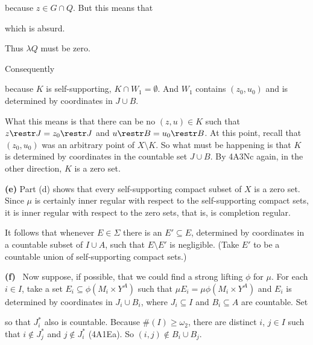 {\noindent because $z\in G\cap Q$.   But this means that 
      
      
\noindent which is absurd.\ \Bang 
      
Thus $\lambda Q$ must be zero. 
      
\medskip 
      
 Consequently 
      
      
\noindent because $K$ is self-supporting, $K\cap W_1=\emptyset$.   And 
$W_1$ contains $(z_0,u_0)$ and is determined by coordinates in $J\cup 
B$. 
      
\medskip 
      
 What this means is that there can be no $(z,u)\in K$ 
such that $z\restr J=z_0\restr J$ and $u\restr B=u_0\restr B$.   At this 
point, recall that $(z_0,u_0)$ was an arbitrary point of $X\setminus K$. 
So what must be happening is that $K$ is determined by coordinates in 
the countable set $J\cup B$.   By 4A3Nc again, in the other 
direction, $K$ is a zero set. 
      
\medskip 
      
{\bf (e)} Part (d) shows that every self-supporting compact subset of 
$X$ is a zero set.   Since $\mu$ is certainly inner regular with respect 
to the self-supporting compact sets, it is inner regular with respect to 
the zero sets, that is, is completion regular. 
      
It follows that whenever $E\in\Sigma$ there is an $E'\subseteq E$, 
determined by coordinates in a countable subset of $I\cup A$, such that 
$E\setminus E'$ is negligible.   (Take $E'$ to be a countable union of 
self-supporting compact sets.) 
      
\medskip 
      
{\bf (f)} \Quer\ Now suppose, if possible, that we could find a strong 
lifting $\phi$ for $\mu$.   For each $i\in I$, take a set 
$E_i\subseteq\phi(M_i\times Y^A)$ such that 
$\mu E_i=\mu\phi(M_i\times Y^A)$ and $E_i$ is determined by coordinates 
in $J_i\cup B_i$, where $J_i\subseteq I$ and $B_i\subseteq A$ are 
countable.   Set 
      
      
\noindent so that $J^*_i$ also is countable.   Because 
$\#(I)\ge\omega_2$, there are distinct $i$, $j\in I$ such that 
$i\notin J^*_j$ and $j\notin J^*_i$ (4A1Ea).   So 
$(i,j)\notin B_i\cup B_j$. 
      
}
